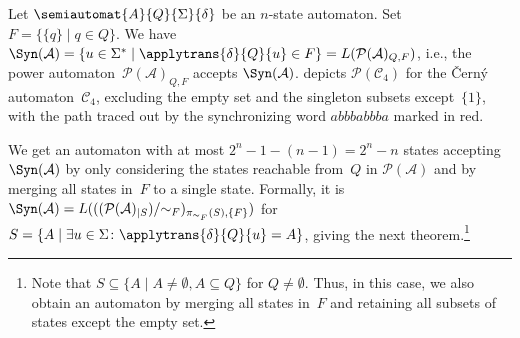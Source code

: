 
Let $\semiautomat{A}{Q}{\Sigma}{\delta}$ be an $n$-state automaton. Set $F = \{ \{q\} \mid q \in Q \}$.
We have $\Syn(\mathcal A) = \{ u \in \Sigma^* \mid \applytrans{\delta}{Q}{u} \in F\} = L(\mathcal P(\mathcal A)_{Q, F})$, i.e.,
the power automaton~$\mathcal P(\mathcal A)_{Q, F}$ accepts $\Syn(\mathcal A)$.
 depicts $\mathcal P(\mathcal C_4)$ for the 
\v{C}ern\'y automaton~$\mathcal C_4$, excluding the empty set and the singleton subsets except~$\{1\}$,
with the path traced out by the synchronizing word $abbbabbba$ marked in red.

We get an automaton with at most $2^n - 1 - (n-1) = 2^n - n$ states accepting $\Syn(\mathcal A)$
by only considering the states reachable from~$Q$ in $\mathcal P(\mathcal A)$
and by merging all states in~$F$ to a single
state. Formally, it is $\Syn(\mathcal A) = L( ( ( \mathcal P(\mathcal A)_{|S} ) / {\sim_F} )_{\pi_{\sim_F}(S), \{F\}} )$
for $S = \{ A \mid \exists u \in \Sigma \colon \applytrans{\delta}{Q}{u} = A \}$,
giving the next theorem.\footnote{Note that 
$S \subseteq \{ A  \mid A \ne \emptyset, A \subseteq Q \}$ for $Q \ne \emptyset$.
Thus, in this case, we also obtain an automaton by merging all states in~$F$
and retaining all subsets of states except the empty set.}

